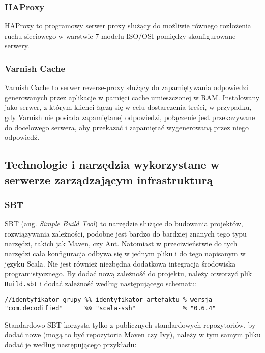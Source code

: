 \subsubsection{HAProxy}

HAProxy to programowy serwer proxy służący do możliwie równego rozłożenia ruchu sieciowego w warstwie 7 modelu ISO/OSI pomiędzy skonfigurowane serwery.

\subsubsection{Varnish Cache}

Varnish Cache to serwer reverse-proxy służący do zapamiętywania odpowiedzi generowanych przez aplikacje w pamięci cache umieszczonej w RAM. Instalowany jako serwer, z którym klienci łączą się w celu dostarczenia treści, w przypadku, gdy Varnish nie posiada zapamiętanej odpowiedzi, połączenie jest przekazywane do docelowego serwera, aby przekazać i zapamiętać wygenerowaną przez niego odpowiedź.

\subsection{Technologie i narzędzia wykorzystane w serwerze zarządzającym infrastrukturą}

\subsubsection{SBT}

SBT (ang. \emph{Simple Build Tool}) to narzędzie służące do budowania projektów, rozwiązywania zależności, podobne jest bardzo do bardziej znanych tego typu narzędzi, takich jak Maven, czy Ant. Natomiast w przeciwieństwie do tych narzędzi cała konfiguracja odbywa się w jednym pliku i do tego napisanym w języku Scala. Nie jest również niezbędna dodatkowa integracja środowiska programistycznego. By dodać nową zależność do projektu, należy otworzyć plik \lstinline|Build.sbt| i dodać zależność według następującego schematu:

\begin{lstlisting}
//identyfikator grupy %% identyfikator artefaktu % wersja
"com.decodified"      %% "scala-ssh"             % "0.6.4"
\end{lstlisting}

Standardowo SBT korzysta tylko z publicznych standardowych repozytoriów, by dodać nowe (mogą to być repozytoria Maven czy Ivy), należy w tym samym pliku dodać je według następującego przykładu:


